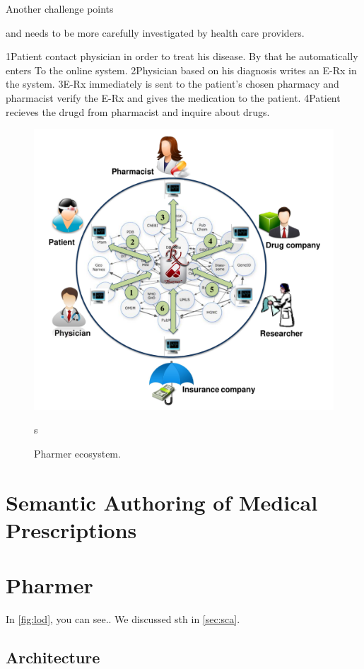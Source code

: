 \documentclass[10pt, conference, compsocconf]{IEEEtran}
\begin{document}
Another challenge points

 and needs to be more carefully investigated by health care providers.

1Patient contact  physician in order to treat his  disease. By that he automatically enters To the online system.
2Physician based on his diagnosis writes an  E-Rx in the system.
3E-Rx immediately is sent to the patient’s chosen pharmacy and pharmacist verify the E-Rx and gives the medication to the patient.
4Patient recieves the drugd from pharmacist and inquire about drugs.  
 
\begin{figure}[tb]
	\centering
		\includegraphics[width=1.0\columnwidth]{images/system.pdf}
	\caption{Pharmer ecosystem.}
	\label{fig:system}s
\end{figure}

\section{Semantic Authoring of Medical Prescriptions}
\label{scamp}

\section{Pharmer}
\label{pharmer}
In \autoref{fig:lod}, you can see..
We discussed sth in \autoref{sec:sca}.

\subsection{Architecture}
\end{document}
